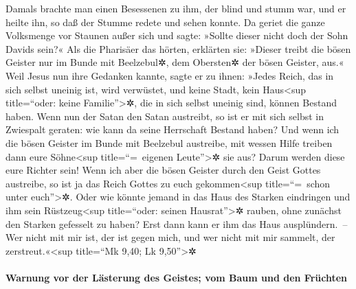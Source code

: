  Damals brachte man einen Besessenen zu ihm, der blind
und stumm war, und er heilte ihn, so daß der Stumme redete und sehen
konnte.  Da geriet die ganze Volksmenge vor Staunen außer
sich und sagte: »Sollte dieser nicht doch der Sohn Davids sein?«
 Als die Pharisäer das hörten, erklärten sie: »Dieser
treibt die bösen Geister nur im Bunde mit Beelzebul✲, dem Obersten✲ der
bösen Geister, aus.«  Weil Jesus nun ihre Gedanken
kannte, sagte er zu ihnen: »Jedes Reich, das in sich selbst uneinig ist,
wird verwüstet, und keine Stadt, kein Haus\textless sup title=``oder:
keine Familie''\textgreater✲, die in sich selbst uneinig sind, können
Bestand haben.  Wenn nun der Satan den Satan austreibt,
so ist er mit sich selbst in Zwiespalt geraten: wie kann da seine
Herrschaft Bestand haben?  Und wenn ich die bösen Geister
im Bunde mit Beelzebul austreibe, mit wessen Hilfe treiben dann eure
Söhne\textless sup title=``=~eigenen Leute''\textgreater✲ sie aus? Darum
werden diese eure Richter sein!  Wenn ich aber die bösen
Geister durch den Geist Gottes austreibe, so ist ja das Reich Gottes zu
euch gekommen\textless sup title=``=~schon unter euch''\textgreater✲.
 Oder wie könnte jemand in das Haus des Starken
eindringen und ihm sein Rüstzeug\textless sup title=``oder: seinen
Hausrat''\textgreater✲ rauben, ohne zunächst den Starken gefesselt zu
haben? Erst dann kann er ihm das Haus ausplündern.~-- 
Wer nicht mit mir ist, der ist gegen mich, und wer nicht mit mir
sammelt, der zerstreut.«\textless sup title=``Mk 9,40; Lk
9,50''\textgreater✲

\hypertarget{warnung-vor-der-luxe4sterung-des-geistes-vom-baum-und-den-fruxfcchten}{%
\paragraph{Warnung vor der Lästerung des Geistes; vom Baum und den
Früchten}\label{warnung-vor-der-luxe4sterung-des-geistes-vom-baum-und-den-fruxfcchten}}

